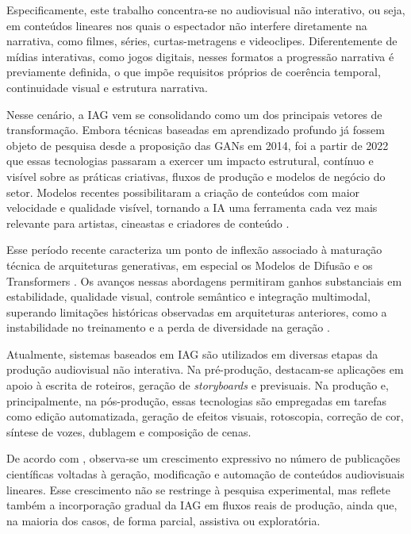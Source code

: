 Especificamente, este trabalho concentra-se no audiovisual não interativo, ou seja, em conteúdos lineares nos quais o espectador não interfere diretamente na narrativa, como filmes, séries, curtas-metragens e videoclipes. Diferentemente de mídias interativas, como jogos digitais, nesses formatos a progressão narrativa é previamente definida, o que impõe requisitos próprios de coerência temporal, continuidade visual e estrutura narrativa.

Nesse cenário, a IAG vem se consolidando como um dos principais vetores de transformação. Embora técnicas baseadas em aprendizado profundo já fossem objeto de pesquisa desde a proposição das GANs em 2014, foi a partir de 2022 que essas tecnologias passaram a exercer um impacto estrutural, contínuo e visível sobre as práticas criativas, fluxos de produção e modelos de negócio do setor. Modelos recentes possibilitaram a criação de conteúdos com maior velocidade e qualidade visível, tornando a IA uma ferramenta cada vez mais relevante para artistas, cineastas e criadores de conteúdo \citep{karras2020analyzing, dhariwal2021diffusion}.

Esse período recente caracteriza um ponto de inflexão associado à maturação técnica de arquiteturas generativas, em especial os Modelos de Difusão e os Transformers \citep{vaswani2017attention}. Os avanços nessas abordagens permitiram ganhos substanciais em estabilidade, qualidade visual, controle semântico e integração multimodal, superando limitações históricas observadas em arquiteturas anteriores, como a instabilidade no treinamento e a perda de diversidade na geração \citep{rombach2022high}. 

Atualmente, sistemas baseados em IAG são utilizados em diversas etapas da produção audiovisual não interativa. Na pré-produção, destacam-se aplicações em apoio à escrita de roteiros, geração de \textit{storyboards} e previsuais. Na produção e, principalmente, na pós-produção, essas tecnologias são empregadas em tarefas como edição automatizada, geração de efeitos visuais, rotoscopia, correção de cor, síntese de vozes, dublagem e composição de cenas. 

De acordo com \citet{RothAleo2026}, observa-se um crescimento expressivo no número de publicações científicas voltadas à geração, modificação e automação de conteúdos audiovisuais lineares. Esse crescimento não se restringe à pesquisa experimental, mas reflete também a incorporação gradual da IAG em fluxos reais de produção, ainda que, na maioria dos casos, de forma parcial, assistiva ou exploratória.

